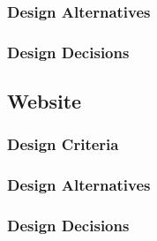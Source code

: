 \documentclass[PPFS.tex]{template/subfiles}
\begin{document}
\subsubsection{Design Alternatives}

\subsubsection{Design Decisions}

\subsection{Website}

\subsubsection{Design Criteria}

\subsubsection{Design Alternatives}

\subsubsection{Design Decisions}
\end{document}
